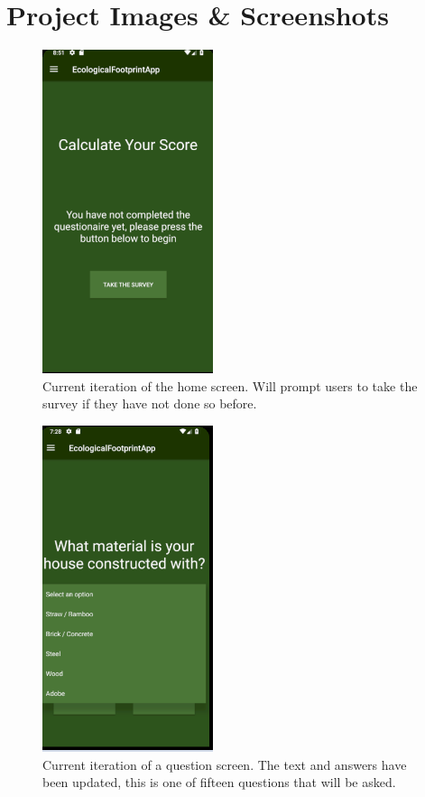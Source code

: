 \documentclass[onecolumn, draftclsnofoot,10pt, compsoc, tikz]{IEEEtran}
\begin{document}
\clearpage
\section{Project Images \& Screenshots}

\begin{figure}[h!]
\centering
\includegraphics[width=50mm]{Homeiter1.png}
\caption{Current iteration of the home screen. Will prompt users to take the survey if they have not done so before.}
\label{fig:method}
\end{figure}

\begin{figure}[h!]
\centering
\includegraphics[width=50mm]{QuestionIter1.png}
\caption{Current iteration of a question screen. The text and answers have been updated, this is one of fifteen questions that will be asked.}
\label{fig:method}
\end{figure}
\end{document}
